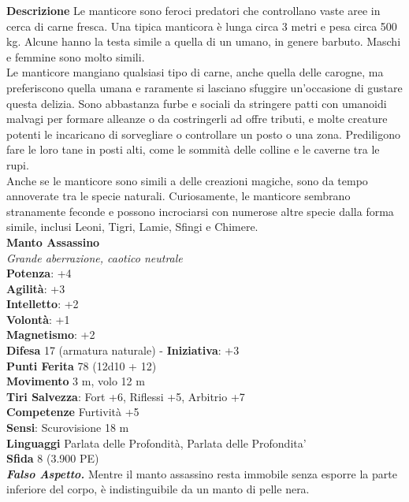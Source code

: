 \begin{multicols}{2}
\textbf{Descrizione}
Le manticore sono feroci predatori che controllano vaste aree in cerca di carne fresca. Una tipica manticora è lunga circa 3 metri e pesa circa 500 kg. Alcune hanno la testa simile a quella di un umano, in genere barbuto. Maschi e femmine sono molto simili.\\

Le manticore mangiano qualsiasi tipo di carne, anche quella delle carogne, ma preferiscono quella umana e raramente si lasciano sfuggire un’occasione di gustare questa delizia. Sono abbastanza furbe e sociali da stringere patti con umanoidi malvagi per formare alleanze o da costringerli ad offre tributi, e molte creature potenti le incaricano di sorvegliare o controllare un posto o una zona. Prediligono fare le loro tane in posti alti, come le sommità delle colline e le caverne tra le rupi.\\

Anche se le manticore sono simili a delle creazioni magiche, sono da tempo annoverate tra le specie naturali. Curiosamente, le manticore sembrano stranamente feconde e possono incrociarsi con numerose altre specie dalla forma simile, inclusi Leoni, Tigri, Lamie, Sfingi e Chimere.\\

\medskip\textbf{Manto Assassino}\\
\emph{Grande aberrazione, caotico neutrale}\\
\textbf{Potenza}: +4\\
\textbf{Agilità}: +3\\
\textbf{Intelletto}: +2\\
\textbf{Volontà}: +1\\
\textbf{Magnetismo}: +2\\
\textbf{Difesa} 17 (armatura naturale) - \textbf{Iniziativa}: +3\\
\textbf{Punti Ferita} 78 (12d10 + 12)\\
\textbf{Movimento} 3 m, volo 12 m\\
\textbf{Tiri Salvezza}: Fort +6, Riflessi +5, Arbitrio +7\\
\textbf{Competenze} Furtività +5\\
\textbf{Sensi}: Scurovisione 18 m \\
\textbf{Linguaggi} Parlata delle Profondità, Parlata delle Profondita'\\
\textbf{Sfida} 8 (3.900 PE)\smallskip\\
\emph{\textbf{Falso Aspetto.}} Mentre il manto assassino resta immobile senza esporre la parte inferiore del corpo, è indistinguibile da un manto di pelle nera.\\


\end{multicols}
